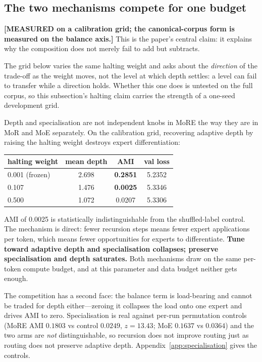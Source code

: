 \subsection{The two mechanisms compete for one budget}
\label{sec:competition}

\textbf{[MEASURED on a calibration grid; the canonical-corpus form is measured on
the balance axis.]} This is the paper's central claim: it explains why the
composition does not merely fail to add but subtracts.

The grid below varies the same halting weight and asks about the
\emph{direction} of the trade-off as the weight moves, not the level at which
depth settles: a level can fail to transfer while a direction holds. Whether this
one does is untested on the full corpus, so this subsection's halting claim
carries the strength of a one-seed development grid.

Depth and specialisation are not independent knobs in MoRE the way they are in MoR
and MoE separately. On the calibration grid, recovering adaptive depth by raising
the halting weight destroys expert differentiation:

\begin{center}
{\dispsize
\setlength{\tabcolsep}{4pt}\renewcommand{\arraystretch}{1.25}
\begin{tabular}{lccc}
\toprule
halting weight & mean depth & AMI & val loss \\
\midrule
0.001 (frozen) & 2.698 & \textbf{0.2851} & 5.2352 \\
0.107 & 1.476 & \textbf{0.0025} & 5.3346 \\
0.500 & 1.072 & 0.0207 & 5.3306 \\
\bottomrule
\end{tabular}
}
\end{center}

AMI of 0.0025 is statistically indistinguishable from the shuffled-label control.
The mechanism is direct: fewer recursion steps means fewer expert applications per
token, which means fewer opportunities for experts to differentiate. \textbf{Tune
toward adaptive depth and specialisation collapses; preserve specialisation and
depth saturates.} Both mechanisms draw on the same per-token compute budget, and at
this parameter and data budget neither gets enough.

The competition has a second face: the balance term is load-bearing and cannot be traded for depth either---zeroing it collapses the load onto one expert and drives AMI to zero. Specialisation is real against per-run permutation controls (MoRE AMI $0.1803$ vs control $0.0249$, $z=13.43$; MoE $0.1637$ vs $0.0364$) and the two arms are \emph{not} distinguishable, so recursion does not improve routing just as routing does not preserve adaptive depth. Appendix~\ref{app:specialisation} gives the controls.

